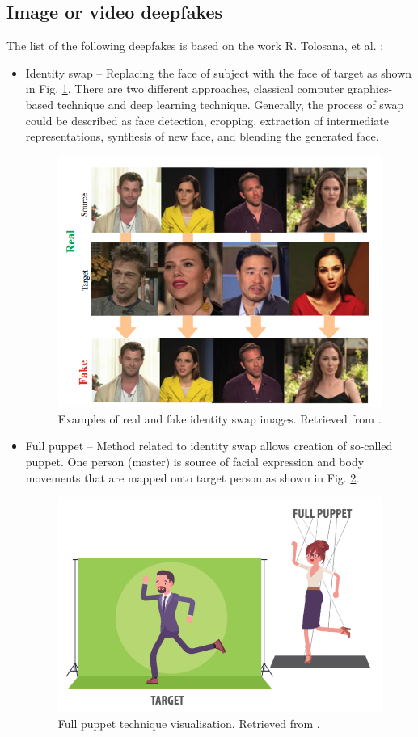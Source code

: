 \subsection{Image or video deepfakes}

The list of the following deepfakes is based on the work R. Tolosana, et al. \cite{IntroductionToDigitalFaceManipulation}:

\begin{itemize}
\item Identity swap – Replacing the face of subject with the face of target as shown in Fig. \ref{fig:idenity_swap}. There are two different approaches, classical computer graphics-based technique and deep learning technique. Generally, the process of swap could be described as face detection, cropping, extraction of intermediate representations, synthesis of new face, and blending the generated face.
\begin{figure}[H]
    \centering
    \includegraphics[width=.66\linewidth]{other-fig/idenity_swap.png}        
    \caption{Examples of real and fake identity swap images. Retrieved from \cite{IntroductionToDigitalFaceManipulation}.}
\label{fig:idenity_swap}
\end{figure}

\item Full puppet – Method related to identity swap allows creation of so-called puppet. One person (master) is source of facial expression and body movements that are mapped onto target person as shown in Fig. \ref{fig:full_puppet}. \cite{IncreasingThreatofDeepfakeIdentites}
\begin{figure}[H]
    \centering
    \includegraphics[width=.43\linewidth]{other-fig/full_puppet.png}        
    \caption{Full puppet technique visualisation. Retrieved from \cite{TheThreatOfDeepfakes}.}
\label{fig:full_puppet}
\end{figure}


\end{itemize}
